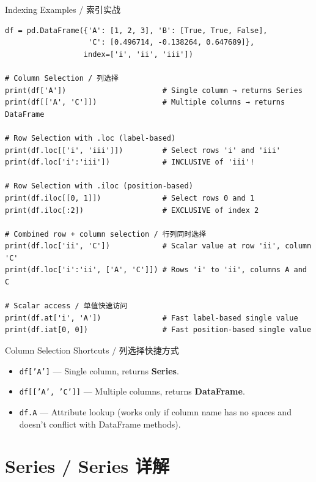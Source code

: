 \documentclass[11pt,a4paper]{article}
\begin{document}
\begin{examplebox}{Indexing Examples / 索引实战}
\begin{lstlisting}
df = pd.DataFrame({'A': [1, 2, 3], 'B': [True, True, False],
                   'C': [0.496714, -0.138264, 0.647689]},
                  index=['i', 'ii', 'iii'])

# Column Selection / 列选择
print(df['A'])                      # Single column → returns Series
print(df[['A', 'C']])               # Multiple columns → returns DataFrame

# Row Selection with .loc (label-based)
print(df.loc[['i', 'iii']])         # Select rows 'i' and 'iii'
print(df.loc['i':'iii'])            # INCLUSIVE of 'iii'!

# Row Selection with .iloc (position-based)
print(df.iloc[[0, 1]])              # Select rows 0 and 1
print(df.iloc[:2])                  # EXCLUSIVE of index 2

# Combined row + column selection / 行列同时选择
print(df.loc['ii', 'C'])            # Scalar value at row 'ii', column 'C'
print(df.loc['i':'ii', ['A', 'C']]) # Rows 'i' to 'ii', columns A and C

# Scalar access / 单值快速访问
print(df.at['i', 'A'])              # Fast label-based single value
print(df.iat[0, 0])                 # Fast position-based single value
\end{lstlisting}
\end{examplebox}

\begin{concept}{Column Selection Shortcuts / 列选择快捷方式}
    \begin{itemize}[itemsep=0.3em]
        \item \texttt{df['A']} — Single column, returns \textbf{Series}.
        \item \texttt{df[['A', 'C']]} — Multiple columns, returns \textbf{DataFrame}.
        \item \texttt{df.A} — Attribute lookup (works only if column name has no spaces and doesn't conflict with DataFrame methods).
    \end{itemize}
\end{concept}

\section{Series / Series 详解}
\end{document}
